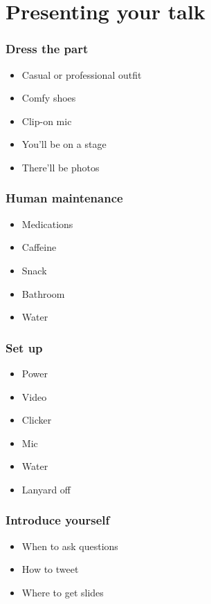 \documentclass{beamer}
\begin{document}
\section{Presenting your talk}

\begin{frame}[fragile]
\tableofcontents[currentsection]
\end{frame}
\begin{frame}[fragile]
\frametitle{Dress the part}
\begin{itemize}
\item Casual or professional outfit
\item Comfy shoes
\item Clip-on mic
\item You'll be on a stage
\item There'll be photos
\end{itemize}
\end{frame}

\begin{frame}[fragile]
\frametitle{Human maintenance}
\begin{itemize}
\item Medications
\item Caffeine
\item Snack
\item Bathroom
\item Water
\end{itemize}
\end{frame}

\begin{frame}[fragile]
\frametitle{Set up}
\begin{itemize}
\item Power
\item Video
\item Clicker
\item Mic
\item Water
\item Lanyard off
\end{itemize}
\end{frame}

\begin{frame}[fragile]
\frametitle{Introduce yourself}
\begin{itemize}
\item When to ask questions
\item How to tweet
\item Where to get slides
\end{itemize}
\end{frame}
\end{document}
